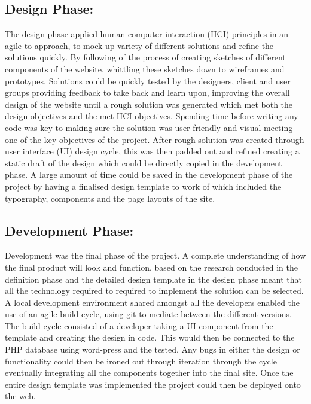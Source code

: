 \documentclass[fontsize=10pt]{extarticle}
\numberwithin{figure}{section} %
\begin{document}
\hypertarget{design-phase}{%
\subsection{Design Phase:}\label{design-phase}}

The design phase applied human computer interaction (HCI) principles in
an agile to approach, to mock up variety of different solutions and
refine the solutions quickly. By following of the process of creating
sketches of different components of the website, whittling these
sketches down to wireframes and prototypes. Solutions could be quickly
tested by the designers, client and user groups providing feedback to
take back and learn upon, improving the overall design of the website
until a rough solution was generated which met both the design
objectives and the met HCI objectives. Spending time before writing any
code was key to making sure the solution was user friendly and visual
meeting one of the key objectives of the project. After rough solution
was created through user interface (UI) design cycle, this was then
padded out and refined creating a static draft of the design which could
be directly copied in the development phase. A large amount of time
could be saved in the development phase of the project by having a
finalised design template to work of which included the typography,
components and the page layouts of the site.

\hypertarget{development-phase}{%
\subsection{Development Phase:}\label{development-phase}}

Development was the final phase of the project. A complete understanding
of how the final product will look and function, based on the research
conducted in the definition phase and the detailed design template in
the design phase meant that all the technology required to required to
implement the solution can be selected. A local development environment
shared amongst all the developers enabled the use of an agile build
cycle, using git to mediate between the different versions. The build
cycle consisted of a developer taking a UI component from the template
and creating the design in code. This would then be connected to the PHP
database using word-press and the tested. Any bugs in either the design
or functionality could then be ironed out through iteration through the
cycle eventually integrating all the components together into the final
site. Once the entire design template was implemented the project could
then be deployed onto the web.
\end{document}
